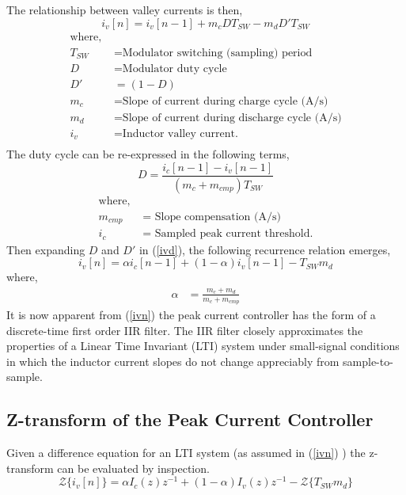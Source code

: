 \documentclass[conference]{IEEEtran}
\begin{document}
The relationship between valley currents is then,
\begin{equation}
i_v[n] =  i_v[n-1] + m_c D T_{SW} - m_d  D' T_{SW}   \label{ivd}
\end{equation} 
\begin{align*}
\text{where, } \\
T_{SW} &= \text{Modulator switching (sampling) period} \\
D &= \text{Modulator duty cycle} \\
D' &= (1-D) \\
m_c &= \text{Slope of current during charge cycle (A/s)} \\
m_d &= \text{Slope of current during discharge cycle (A/s)}\\
i_v &= \text{Inductor valley current.} \\
\end{align*}
The duty cycle can be re-expressed in the following terms,
\begin{equation}
D = \dfrac{i_c [n-1] - i_v [n-1]} {(m_c + m_{cmp})T_{SW}}
\end{equation}
\begin{align*}
\text{where, } \\
m_{cmp} &= \text{ Slope compensation (A/s)}\\
i_c &= \text{ Sampled peak current threshold.} 
\end{align*}
Then expanding $ D $ and $ D' $ in (\ref{ivd}), the following recurrence relation emerges,
\begin{equation}
i_v[n] =  \alpha i_c[n-1] + ( 1 - \alpha ) i_v [n-1] - T_{SW} m_d   \label{ivn}
\end{equation}
where,
\begin{align}
\alpha &= \frac{m_c + m_d} {m_c + m_{cmp}} \label{const_alpha}
\end{align}
It is now apparent from (\ref{ivn}) the peak current controller has the form of a discrete-time first order IIR filter. The IIR filter closely approximates the properties of a Linear Time Invariant (LTI) system under small-signal conditions in which the inductor current slopes do not change appreciably from sample-to-sample.   

\subsection{Z-transform of the Peak Current Controller}
Given a difference equation for an LTI system (as assumed in (\ref{ivn}) ) the z-transform can be evaluated by inspection.  
\begin{equation}
\mathcal{Z} \{ i_v[n] \} =  \alpha I_c(z) z^{-1} + ( 1 - \alpha ) I_v (z) z^{-1} - \mathcal{Z} \{T_{SW}m_d\}  \label{ivz}
\end{equation}
\end{document}
